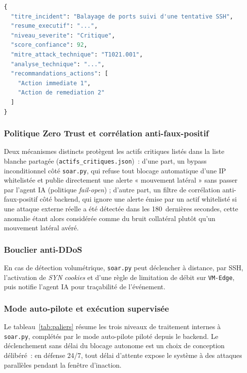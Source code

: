 \begin{lstlisting}[language=Python,caption={Format de diagnostic structuré publié par l'agent IA (exemple illustratif).},label={lst:json7}]
{
  "titre_incident": "Balayage de ports suivi d'une tentative SSH",
  "resume_executif": "...",
  "niveau_severite": "Critique",
  "score_confiance": 92,
  "mitre_attack_technique": "T1021.001",
  "analyse_technique": "...",
  "recommandations_actions": [
    "Action immediate 1",
    "Action de remediation 2"
  ]
}
\end{lstlisting}

\subsubsection{Politique Zero Trust et corrélation anti-faux-positif}
Deux mécanismes distincts protègent les actifs critiques listés dans la liste blanche partagée (\texttt{actifs\_critiques.json})~: d'une part, un bypass inconditionnel côté \texttt{soar.py}, qui refuse tout blocage automatique d'une IP whitelistée et publie directement une alerte « mouvement latéral » sans passer par l'agent IA (politique \emph{fail-open}) ; d'autre part, un filtre de corrélation anti-faux-positif côté backend, qui ignore une alerte émise par un actif whitelisté si une attaque externe réelle a été détectée dans les 180~dernières secondes, cette anomalie étant alors considérée comme du bruit collatéral plutôt qu'un mouvement latéral avéré.

\subsubsection{Bouclier anti-DDoS}
En cas de détection volumétrique, \texttt{soar.py} peut déclencher à distance, par SSH, l'activation de \emph{SYN cookies} et d'une règle de limitation de débit sur \texttt{VM-Edge}, puis notifie l'agent IA pour traçabilité de l'événement.

\subsubsection{Mode auto-pilote et exécution supervisée}
Le tableau~\ref{tab:paliers} résume les trois niveaux de traitement internes à \texttt{soar.py}, complétés par le mode auto-pilote piloté depuis le backend. Le déclenchement sans délai du blocage autonome est un choix de conception délibéré~: en défense 24/7, tout délai d'attente expose le système à des attaques parallèles pendant la fenêtre d'inaction.

